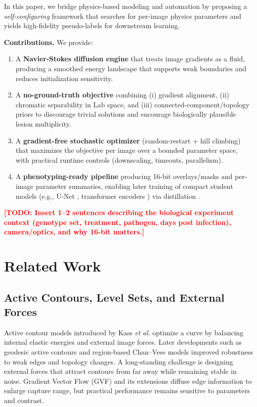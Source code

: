 \documentclass[journal]{IEEEtran}
\newcommand{\TODO}[1]{\textcolor{red}{\textbf{[TODO: #1]}}}
\begin{document}
In this paper, we bridge physics-based modeling and automation by proposing a \emph{self-configuring} framework that searches for per-image physics parameters and yields high-fidelity pseudo-labels for downstream learning.

\textbf{Contributions.} We provide:
\begin{enumerate}
    \item A \textbf{Navier-Stokes diffusion engine} that treats image gradients as a fluid, producing a smoothed energy landscape that supports weak boundaries and reduces initialization sensitivity.
    \item A \textbf{no-ground-truth objective} combining (i) gradient alignment, (ii) chromatic separability in Lab space, and (iii) connected-component/topology priors to discourage trivial solutions and encourage biologically plausible lesion multiplicity.
    \item A \textbf{gradient-free stochastic optimizer} (random-restart + hill climbing) that maximizes the objective per image over a bounded parameter space, with practical runtime controls (downscaling, timeouts, parallelism).
    \item A \textbf{phenotyping-ready pipeline} producing 16-bit overlays/masks and per-image parameter summaries, enabling later training of compact student models (e.g., U-Net \cite{ronneberger2015u}, transformer encoders \cite{oquab2023dinov2}) via distillation \cite{hinton2015distilling}.
\end{enumerate}

\TODO{Insert 1--2 sentences describing the biological experiment context (genotype set, treatment, pathogen, days post infection), camera/optics, and why 16-bit matters.}

\section{Related Work}

\subsection{Active Contours, Level Sets, and External Forces}
Active contour models introduced by Kass \emph{et al.} \cite{kass1988snakes} optimize a curve by balancing internal elastic energies and external image forces. Later developments such as geodesic active contours \cite{caselles1997geodesic} and region-based Chan--Vese models \cite{chan2001active} improved robustness to weak edges and topology changes. A long-standing challenge is designing external forces that attract contours from far away while remaining stable in noise. Gradient Vector Flow (GVF) \cite{xu1998gvf} and its extensions diffuse edge information to enlarge capture range, but practical performance remains sensitive to parameters and contrast.
\end{document}

